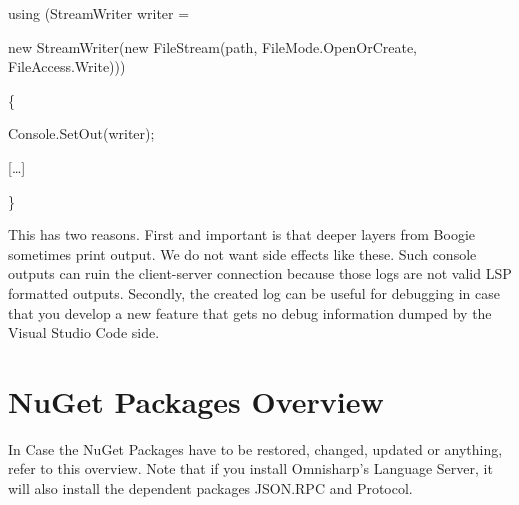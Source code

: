 \documentclass[]{book}
\begin{document}
using (StreamWriter writer =

new StreamWriter(new FileStream(path, FileMode.OpenOrCreate, FileAccess.Write)))

\{

Console.SetOut(writer);

{[}\ldots{}{]}

\}

This has two reasons. First and important is that deeper layers from Boogie sometimes print output. We do not want side effects like these. Such console outputs can ruin the client-server connection because those logs are not valid LSP formatted outputs. Secondly, the created log can be useful for debugging in case that you develop a new feature that gets no debug information dumped by the Visual Studio Code side.

\section{NuGet Packages Overview}\label{nuget-packages-overview}

In Case the NuGet Packages have to be restored, changed, updated or anything, refer to this overview. Note that if you install Omnisharp's Language Server, it will also install the dependent packages JSON.RPC and Protocol.
\end{document}

